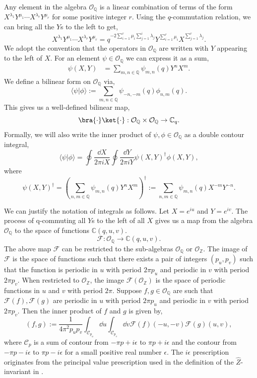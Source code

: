 \documentclass{article}
\newcommand{\Z}{{\mathbb Z}}
\newcommand{\C}{{\mathbb C}}
\newcommand{\Q}{{\mathbb Q}}
\def\be{\begin{equation}}
\def\ee{\end{equation}}
\numberwithin{corollary}{theorem}
\numberwithin{corollary}{proposition}
\begin{document}
Any element in the algebra $\mathcal{O}_{\Q}$ is a linear combination of terms of the form $X^{\lambda_{1}} Y^{\mu_{1}} \cdots X^{\lambda_{r}} Y^{\mu_{r}}$ for some positive integer $r$. Using the $q$-commutation relation, we can bring all the $Y$s to the left to get,
\be 
X^{\lambda_{1}} Y^{\mu_{1}} \cdots X^{\lambda_{r}} Y^{\mu_{r}} = q^{-2\sum_{i=1}^{r} \mu_{i} \sum_{j=1}^{i} \lambda_{j}} Y^{\sum_{i=1}^{r} \mu_{i}} X^{\sum_{j=1}^{r} \lambda_{j}}.
\ee 
We adopt the convention that the operators in $\mathcal{O}_{\Q}$ are written with $Y$ appearing to the left of $X$. For an element $\psi \in \mathcal{O}_{\Q}$ we can express it as a sum,
\begin{align*}
    \psi(X,Y) &=  \sum_{m,n \in \Q}  \psi_{m,n}(q) Y^{n} X^{m}.
\end{align*}
We define a bilinear form on $\mathcal{O}_{\Q}$ via, 
\be 
\langle \psi | \phi \rangle := \sum_{m,n \in \Q} \psi_{-n,-m}(q) \phi_{n,m}(q).
\ee 
This gives us a well-defined bilinear map,
$$\bra{\cdot}\ket{\cdot}: \mathcal{O}_{\Q} \times \mathcal{O}_{\Q} \rightarrow \C_q .$$
Formally, we will also write the inner product of $\psi, \phi \in \mathcal{O}_{\Q}$ as a double contour integral,
\be \label{innerprod}
\langle \psi | \phi \rangle = \oint \frac{\dd X}{2\pi i X} \oint \frac{\dd Y}{2\pi i Y} \psi(X,Y)^\dagger \phi(X,Y),
\ee
where
\be 
\psi(X,Y)^\dagger = \left( \sum_{n,m \in \Q} \psi_{m,n}(q) Y^n X^m \right)^\dagger := \sum_{n,m \in \Q} \psi_{m,n}(q)X^{-m} Y^{-n}.
\ee 

We can justify the notation of integrals as follows. Let $X= e^{i u}$ and $Y= e^{i v}$. The process of q-commuting all $Y$s to the left of all $X$ gives us a map from the algebra $\mathcal{O}_{\Q}$ to the space of functions $\C(q,u,v)$.  
\be 
\mathcal{F}: \mathcal{O}_{\Q} \rightarrow \C(q,u,v).
\ee 
The above map $\mathcal{F}$ can be restricted to the sub-algebras $\mathcal{O}_{\Q}$ or $\mathcal{O}_{\Z}$. The image of $\mathcal{F}$ is the space of functions such that there exists a pair of integers $(p_{u},p_{v})$ such that the function is periodic in $u$ with period $2 \pi p_{u}$ and periodic in $v$ with period $2 \pi p_{v}$. When restricted to $\mathcal{O}_{\Z}$, the image $\mathcal{F} (\mathcal{O}_{\Z})$ is the space of periodic functions in $u$ and $v$ with period $2 \pi$. Suppose $f, g \in \mathcal{O}_{\Q}$ are such that $\mathcal{F}(f), \mathcal{F}(g)$ are periodic in $u$ with period $2 \pi p_{u}$ and periodic in $v$ with period $2 \pi p_{v}$. Then the inner product of $f$ and $g$ is given by,
\be 
(f,g) := \frac{1}{4 \pi^{2} p_{u} p_{v} } \int_{\mathcal{C}_{p_{u}}} \dd u \int_{\mathcal{C}_{p_{v}}} \dd v  \mathcal{F}(f)(-u,-v) \mathcal{F}(g)(u,v),
\ee 
where $\mathcal{C}_{p}$ is a sum of contour from $-\pi p+i \epsilon$ to $\pi p+i \epsilon$ and the contour from $-\pi p - i \epsilon$ to $\pi p -i \epsilon$ for a small positive real number $\epsilon$. The $i \epsilon$ prescription originates from the principal value prescription used in the definition of the $\hat{Z}$-invariant in \cite{GPPV}. 
\end{document}

